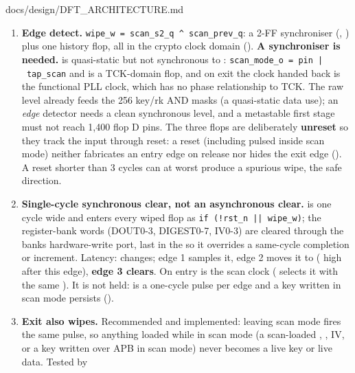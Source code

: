 \begin{relocated}{docs/design/DFT_ARCHITECTURE.md}
\begin{enumerate}
\def\labelenumi{\arabic{enumi}.}
\tightlist
\item
  \textbf{Edge detect.}
  \texttt{wipe\_\allowbreak{}w\ =\allowbreak{}\ scan\_\allowbreak{}s2\_\allowbreak{}q\ \textasciicircum{}\ scan\_\allowbreak{}prev\_\allowbreak{}q}:
  a 2-FF synchroniser (, ) plus one
  history flop, all in the crypto clock domain ().
  \textbf{A synchroniser is needed.}  is quasi-static
  but not synchronous to :
  \texttt{scan\_\allowbreak{}mode\_\allowbreak{}o\ =\allowbreak{}\ pin\ |\ tap\_\allowbreak{}scan}
  and  is a TCK-domain flop, and on exit the clock handed
  back is the functional PLL clock, which has no phase relationship to
  TCK. The raw level already feeds the 256 key/rk AND masks (a
  quasi-static data use); an \emph{edge} detector needs a clean
  synchronous level, and a metastable first stage must not reach 1,400
  flop D pins. The three flops are deliberately \textbf{unreset} so they
  track the input through reset: a reset (including 
  pulsed inside scan mode) neither fabricates an entry edge on release
  nor hides the exit edge
  (). A reset
  shorter than 3 cycles can at worst produce a spurious wipe, the safe
  direction.
\item
  \textbf{Single-cycle synchronous clear, not an asynchronous clear.}
   is one cycle wide and enters every wiped flop as
  \texttt{if\ (!rst\_\allowbreak{}n\ ||\ wipe\_\allowbreak{}w)}; the
  register-bank words (DOUT0-3, DIGEST0-7, IV0-3) are cleared through
  the bank\textquotesingle s hardware-write port, last in the
   so it overrides a same-cycle completion or
   increment. Latency:  changes; edge 1
  samples it, edge 2 moves it to  ( high
  after this edge), \textbf{edge 3 clears}. On entry  is
  the scan clock ( selects it with the same
  ). It is not held:  is a one-cycle pulse
  per edge and a key written in scan mode persists
  ().
\item
  \textbf{Exit also wipes.} Recommended and implemented: leaving scan
  mode fires the same pulse, so anything loaded while in scan mode (a
  scan-loaded , , IV, or a key written over APB in
  scan mode) never becomes a live key or live data. Tested by

\end{enumerate}
\end{relocated}
